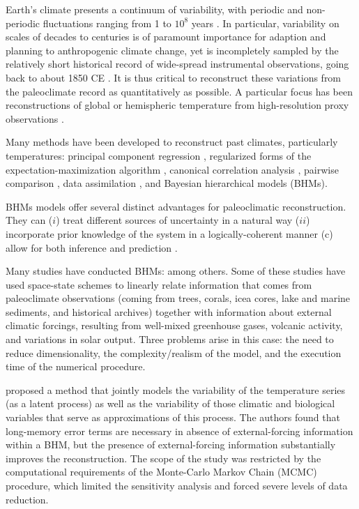 \documentclass[12pt]{amsart}
\theoremstyle{plain}
\theoremstyle{definition}
\theoremstyle{remark}
\begin{document}
Earth's climate presents a continuum of variability, with periodic and non-periodic fluctuations ranging from 1 to $10^8$ years \citep{pelletier_power_1998,ghil2002natural,huybers_links_2006}. In particular, variability on scales of decades to centuries is of paramount importance for adaption and planning to anthropogenic climate change, yet is incompletely sampled by the relatively short historical record of wide-spread instrumental observations, going back to about 1850 CE \citep{AR5_chap5}. It is thus critical to reconstruct these variations from the paleoclimate record as quantitatively as possible.  A particular focus has been reconstructions of global or hemispheric temperature from high-resolution proxy observations \citep{Jones_Holocene09}.

Many methods have been developed to reconstruct past climates, particularly temperatures:  principal component regression
\citep{MBH98,MBH99,luterbacher2004european,Wahl2012,Neukom:2014}, regularized forms of the expectation-maximization algorithm \citep{Schneider2001,bradley2005proxy,mann2005testing,mann2007robust,rutherford2003climate,steig2009,JEG10a,JEG10b,Guillot_AOAS2015}, canonical
correlation analysis \citep{smerdon2010pseudoproxy,Wang_CP2014,Evans_grl2014}, pairwise comparison
\citep{Hanhijarvi2013,Gergis2016}, data assimilation \citep{Lee_CD08,Hakim2016}, and Bayesian hierarchical models (BHMs). 

BHMs models offer several distinct advantages for paleoclimatic reconstruction. They can ($i$) treat different sources of uncertainty in a natural way ($ii$) incorporate prior knowledge of the system in a logically-coherent manner \citep{Jaynes04} (c) allow for both inference and prediction \citep{Tingley_QSR2012}. 

Many studies have conducted BHMs: \citep{boli1, tingley1,tingley2,tingley2013_Ext,werner2012pseudoproxy,Barboza2014} among others. Some of these studies have used space-state
schemes to linearly relate information that comes from paleoclimate observations (coming from trees, corals, icea cores, lake and marine sediments, and historical archives) together with information about external climatic forcings, resulting from 
well-mixed greenhouse gases, volcanic activity, and variations in solar output.   Three problems arise in this
case: the need to reduce dimensionality, the complexity/realism of the model, and the execution time of the numerical procedure. 

\citet{Barboza2014} proposed a method that jointly models the variability of the
temperature series (as a latent process) as well as the variability of those
climatic and biological variables that serve as approximations of this process.
The authors found that long-memory error terms are necessary in absence of
external-forcing information within a BHM, but the
presence of external-forcing information substantially improves the reconstruction. The scope of the study was restricted by the computational requirements of the Monte-Carlo Markov Chain (MCMC) procedure, which limited the sensitivity analysis and forced severe levels of data reduction. 
\end{document}
